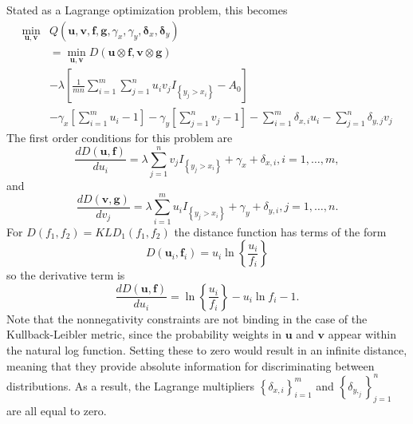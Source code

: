 Stated as a Lagrange optimization problem, this becomes
\begin{align}
    \min_{\mathbf{u},\mathbf{v}} & Q(\mathbf{u},\mathbf{v}, \mathbf{f},\mathbf{g},
    \gamma_x,\gamma_y,\mathbf{\delta}_{x},\mathbf{\delta}_{y}) \\
    & = \min_{\mathbf{u},\mathbf{v}}
        D(\mathbf{u} \otimes \mathbf{f}, \mathbf{v} \otimes \mathbf{g}) \\
    &           - \lambda \left[ \frac{1}{m n} \sum_{i = 1}^{m} \sum_{j = 1}^{n} u_i v_j I_{\left\{ y_j > x_i \right\}} - A_0 \right] \\
    &           - \gamma_x \left[ \sum_{i = 1}^{m} u_i - 1 \right]
                - \gamma_y \left[ \sum_{j = 1}^{n} v_j - 1 \right]
                - \sum_{i = 1}^{m} \delta_{x,i} u_i
                - \sum_{j = 1}^{n} \delta_{y,j} v_j
\end{align}
% 
\noindent The first order conditions for this problem are
\begin{equation}
    \frac{d D(\mathbf{u},\mathbf{f})}{d u_i} = \lambda \sum_{j = 1}^{n} v_j I_{\left\{ y_j > x_i \right\}} + \gamma_x + \delta_{x,i},
    i = 1, \dots, m,
\end{equation}
and
\begin{equation}
    \frac{d D(\mathbf{v},\mathbf{g})}{d v_j} = \lambda \sum_{i = 1}^{m} u_i I_{\left\{ y_j > x_i \right\}} + \gamma_y + \delta_{y,i},
    j = 1, \dots, n.
\end{equation}
% 
% 
\noindent For $D(f_1, f_2) = KLD_1(f_1, f_2)$ the distance function has terms of the form
\begin{equation}
    D(\mathbf{u}_i, \mathbf{f}_i) = u_i \ln \left\{ \frac{u_i}{f_i} \right\}
\end{equation}
\noindent so the derivative term is
\begin{equation}
    \frac{d D(\mathbf{u},\mathbf{f})}{d u_i} = \ln \left\{ \frac{u_i}{f_i} \right\} - u_i\ln f_i - 1.
\end{equation}
% 
% 
Note that the nonnegativity constraints are not binding in the case of the Kullback-Leibler metric,
since the probability weights in $\mathbf{u}$ and $\mathbf{v}$ appear within the natural log function.
Setting these to zero would result in an infinite distance, 
meaning that they provide absolute information for discriminating between distributions. 
As a result, the Lagrange multipliers $\left\{ \delta_{x,i} \right\}_{i=1}^{m}$ and $\left\{ \delta_{y,_j} \right\}_{j=1}^{n}$ are all equal to zero.


